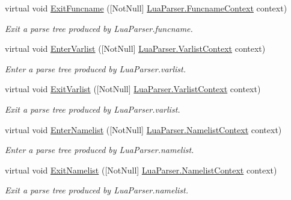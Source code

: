 \begin{DoxyCompactItemize}
virtual void \mbox{\hyperlink{classzlua_1_1_lua_base_listener_a843fca537940a8a34507118ef087212b}{Exit\+Funcname}} (\mbox{[}Not\+Null\mbox{]} \mbox{\hyperlink{classzlua_1_1_lua_parser_1_1_funcname_context}{Lua\+Parser.\+Funcname\+Context}} context)
\begin{DoxyCompactList}\small\item\em Exit a parse tree produced by Lua\+Parser.\+funcname. \end{DoxyCompactList}\item 
virtual void \mbox{\hyperlink{classzlua_1_1_lua_base_listener_a1b27cf500dda1c0eab2cbb8c747dddba}{Enter\+Varlist}} (\mbox{[}Not\+Null\mbox{]} \mbox{\hyperlink{classzlua_1_1_lua_parser_1_1_varlist_context}{Lua\+Parser.\+Varlist\+Context}} context)
\begin{DoxyCompactList}\small\item\em Enter a parse tree produced by Lua\+Parser.\+varlist. \end{DoxyCompactList}\item 
virtual void \mbox{\hyperlink{classzlua_1_1_lua_base_listener_ad18289513e8ed51c9505bf21aa5c7523}{Exit\+Varlist}} (\mbox{[}Not\+Null\mbox{]} \mbox{\hyperlink{classzlua_1_1_lua_parser_1_1_varlist_context}{Lua\+Parser.\+Varlist\+Context}} context)
\begin{DoxyCompactList}\small\item\em Exit a parse tree produced by Lua\+Parser.\+varlist. \end{DoxyCompactList}\item 
virtual void \mbox{\hyperlink{classzlua_1_1_lua_base_listener_a7e9f223eea630cb4d7deac2257225a75}{Enter\+Namelist}} (\mbox{[}Not\+Null\mbox{]} \mbox{\hyperlink{classzlua_1_1_lua_parser_1_1_namelist_context}{Lua\+Parser.\+Namelist\+Context}} context)
\begin{DoxyCompactList}\small\item\em Enter a parse tree produced by Lua\+Parser.\+namelist. \end{DoxyCompactList}\item 
virtual void \mbox{\hyperlink{classzlua_1_1_lua_base_listener_aa501c2703fd2c5279c7cd6748aebd84b}{Exit\+Namelist}} (\mbox{[}Not\+Null\mbox{]} \mbox{\hyperlink{classzlua_1_1_lua_parser_1_1_namelist_context}{Lua\+Parser.\+Namelist\+Context}} context)
\begin{DoxyCompactList}\small\item\em Exit a parse tree produced by Lua\+Parser.\+namelist. \end{DoxyCompactList}\item 

\end{DoxyCompactItemize}
